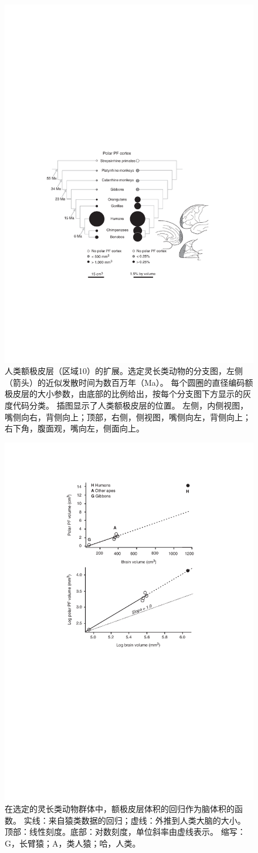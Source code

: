 \begin{figure}[!htb]
	\centering
	\includegraphics[width=0.5\linewidth]{chap9/9_1}
	\caption{人类额极皮层（区域10）的扩展。选定灵长类动物的分支图，左侧（箭头）的近似发散时间为数百万年（Ma）。
		每个圆圈的直径编码额极皮层的大小参数，由底部的比例给出，按每个分支图下方显示的灰度代码分类。
		插图显示了人类额极皮层的位置。
		左侧，内侧视图，嘴侧向右，背侧向上；顶部，右侧，侧视图，嘴侧向左，背侧向上；右下角，腹面观，嘴向左，侧面向上\cite{tsujimoto2011frontal}。\label{fig:fig_9_1}}
\end{figure}

\par
\begin{figure}[!htb]
	\centering
	\includegraphics[width=0.5\linewidth]{chap9/9_2}
	\caption{在选定的灵长类动物群体中，额极皮层体积的回归作为脑体积的函数。
		实线：来自猿类数据的回归；虚线：外推到人类大脑的大小。
		顶部：线性刻度。底部：对数刻度，单位斜率由虚线表示。
		缩写：G，长臂猿；A，类人猿；哈，人类\cite{semendeferi2001prefrontal}。\label{fig:fig_9_2}}
\end{figure}

